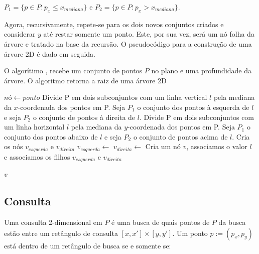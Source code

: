     $P_1 = \{p \in P : p_x \leq x_{mediana}\}$ e $P_2 = \{p \in P : p_x > x_{mediana}\}$.

Agora, recursivamente, repete-se para os dois novos conjuntos criados e considerar $y$ até restar 
somente um ponto. Este, por sua vez, será um nó folha da árvore e tratado na base da recursão. 
O pseudocódigo para a construção de uma árvore 2D é dado em seguida.

\begin{algorithm}
    \caption{O algorítimo , recebe um conjunto de 
    pontos $P$ no plano e uma profundidade da árvore.
    O algoritmo retorna a raiz de uma árvore 2D}
    \begin{algorithmic}[1]
            \Return $nó \leftarrow ponto$
        \Else
            \State
                Divide P em dois subconjuntos com um linha vertical $l$ pela mediana da $x$-coordenada
                dos pontos em P. Seja $P_1$ o conjunto dos pontos à esquerda de $l$ e seja
                $P_2$ o conjunto de pontos à direita de $l$.
            \Else
            \State
                Divide P em dois subconjuntos com um linha horizontal $l$ pela mediana da $y$-coordenada
                dos pontos em P. Seja $P_1$ o conjunto dos pontos abaixo de $l$ e seja
                $P_2$ o conjunto de pontos acima de $l$.
            \EndIf
        \EndIf
        \State Cria os nós $v_{esquerda}$ e $v_{direita}$
        \State $v_{esquerda} \leftarrow $ 
        \State $v_{direita} \leftarrow $ 
        \State Cria um nó $v$, associamos o valor $l$ e associamos os filhos $v_{esquerda}$ e $v_{direita}$ 

        \Return $v$
        \EndFunction
    \end{algorithmic}
\end{algorithm}

\clearpage


\subsection{Consulta}
Uma consulta 2-dimensional em $P$ é uma busca de quais pontos de $P$ da busca estão
entre um retângulo de consulta \([x,x']  \times  [y,y']\). 
Um ponto $p:= (p_x, p_y)$ está dentro de um retângulo de busca se e somente se:

